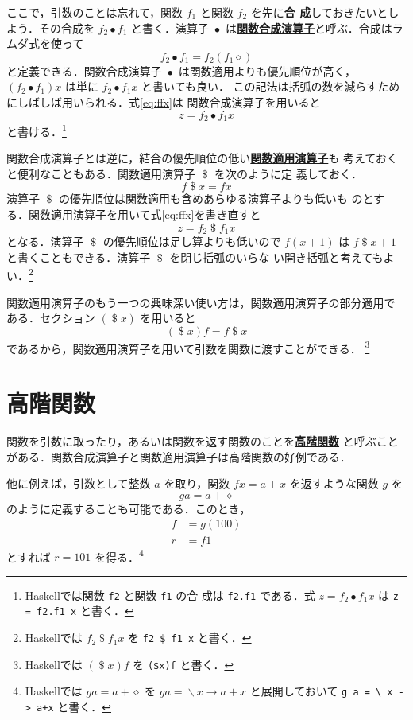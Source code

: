 \documentclass[a5paper,twoside,fleqn,draft]{jsbook}
\newcommand{\programminglanguage}[1]{\textsf{#1}}
\newcommand{\haskell}{\programminglanguage{Haskell}}
\newcommand{\keyword}[1]{{\underline{\textbf{#1}}}}
\newcommand{\code}[1]{\texttt{#1}}
\newcommand{\mAnonParam}{\diamond}
\DeclareMathOperator{\mApply}{\$}
\DeclareMathOperator{\mComp}{\bullet} %
\DeclareMathOperator{\mLambda}{\backslash}
\DeclareMathOperator{\mLambdaArrow}{\rightarrow}
\newcommand{\mLambdaExp}[2]{\mLambda{#1}\mLambdaArrow{#2}}
\begin{document}
ここで，引数のことは忘れて，関数 $f_1$ と関数 $f_2$ を先に\keyword{合
  成}しておきたいとしよう．その合成を $f_2\mComp f_1$ と書く．演算子
$\mComp$ は\keyword{関数合成演算子}と呼ぶ．合成はラムダ式を使って
\begin{equation}
  f_2\mComp f_1=f_2(f_1\mAnonParam)
\end{equation}
と定義できる．関数合成演算子 $\mComp$ は関数適用よりも優先順位が高く，
$\left(f_2\mComp f_1\right)x$ は単に $f_2\mComp f_1x$ と書いても良い．
この記法は括弧の数を減らすためにしばしば用いられる．式\eqref{eq:ffx}は
関数合成演算子を用いると
\begin{equation}
z=f_2\mComp f_1x
\end{equation}
と書ける．\footnote{\haskell では関数 \code{f2} と関数 \code{f1} の合
  成は \code{f2.f1} である．式 $z=f_2\mComp f_1x$ は \code{z = f2.f1
    x} と書く．}

関数合成演算子とは逆に，結合の優先順位の低い\keyword{関数適用演算子}も
考えておくと便利なこともある．関数適用演算子 $\mApply$ を次のように定
義しておく．
\begin{equation}
f\mApply x=fx
\end{equation}
演算子 $\mApply$ の優先順位は関数適用も含めあらゆる演算子よりも低いも
のとする．関数適用演算子を用いて式\eqref{eq:ffx}を書き直すと
\begin{equation}
z=f_2\mApply f_1x
\end{equation}
となる．演算子 $\mApply$ の優先順位は足し算よりも低いので $f(x+1)$ は
$f\mApply x+1$ と書くこともできる．演算子 $\mApply$ を閉じ括弧のいらな
い開き括弧と考えてもよい．\footnote{\haskell では $f_2\mApply f_1x$ を
  \code{f2 \$ f1 x} と書く．}

関数適用演算子のもう一つの興味深い使い方は，関数適用演算子の部分適用で
ある．セクション $(\mApply x)$ を用いると
\begin{equation}
(\mApply x)f=f\mApply x
\end{equation}
であるから，関数適用演算子を用いて引数を関数に渡すことができる．
\footnote{\haskell では $(\mApply x)f$ を \code{(\$x)f} と書く．}

\section{高階関数}

関数を引数に取ったり，あるいは関数を返す関数のことを\keyword{高階関数}
と呼ぶことがある．関数合成演算子と関数適用演算子は高階関数の好例である．

他に例えば，引数として整数 $a$ を取り，関数 $fx=a+x$ を返すような関数
$g$ を
\begin{equation}
ga=a+\mAnonParam
\end{equation}
のように定義することも可能である．このとき，
\begin{align}
f&=g(100)\\ r&=f1
\end{align}
とすれば $r=101$ を得る．\footnote{\haskell では $ga=a+\mAnonParam$ を
  $ga=\mLambdaExp{x}{a+x}$ と展開しておいて \code{g a = \textbackslash
    x -> a+x} と書く．}
\end{document}
